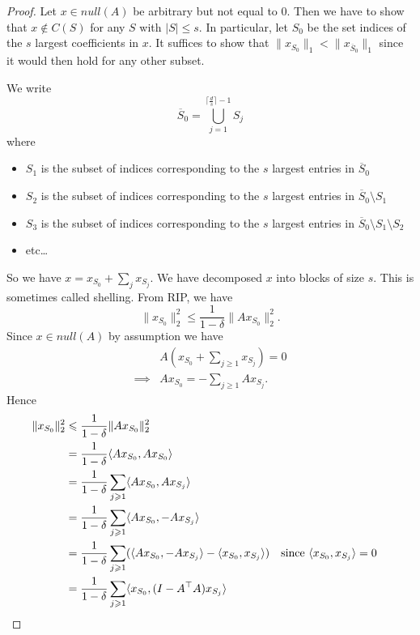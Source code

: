\documentclass[11pt]{article}
\begin{document}
\begin{proof}
Let $x \in null(A)$ be arbitrary but not equal to $0$. Then we have to show that $x \not\in C(S)$ for any $S$ with $|S| \le s$. In particular, let $S_0$ be the set indices of the $s$ largest coefficients in $x$. It suffices to show that $\|x_{S_0}\|_1 <  \|x_{\overline{S}_0}\|_1$ since it would then hold for any other subset.

We write
\[
\overline{S}_0 = \bigcup\limits_{j = 1}^{\lceil \frac{d}{s} \rceil - 1} S_j
\]
where 
\begin{itemize}
\item $S_1$ is the subset of indices corresponding to the $s$ largest entries in $\overline{S}_0$
\item $S_2$ is the subset of indices corresponding to the $s$ largest entries in $\overline{S}_0\setminus S_1$
\item $S_3$ is the subset of indices corresponding to the $s$ largest entries in $\overline{S}_0\setminus S_1 \setminus S_2$
\item etc\ldots
\end{itemize}
So we have $x = x_{S_0} + \sum\limits_j x_{S_j}$. We have decomposed $x$ into blocks of size $s$. This is sometimes called shelling. From RIP, we have
\[
\|x_{S_0}\|_2^2 \le \frac{1}{1 - \delta}\|Ax_{S_0}\|_2^2.
\]
Since $x \in null(A)$ by assumption we have
\begin{align*}
&A(x_{S_0} + \sum\limits_{j \ge 1} x_{S_j}) = 0\\
\implies&Ax_{S_0} = -\sum\limits_{j \ge 1} Ax_{S_j}.
\end{align*}
Hence
\begin{align*}
\|x_{S_0}\|_2^2 &\le \frac{1}{1 - \delta}\|Ax_{S_0}\|_2^2\\
                &= \frac{1}{1 - \delta}\langle Ax_{S_0}, Ax_{S_0}\rangle\\
                &= \frac{1}{1 - \delta}\sum\limits_{j \ge 1}\langle Ax_{S_0}, Ax_{S_j}\rangle\\
                &= \frac{1}{1 - \delta}\sum\limits_{j \ge 1}\langle Ax_{S_0}, -Ax_{S_j}\rangle\\
                &=  \frac{1}{1 - \delta}\sum\limits_{j \ge 1}(\langle Ax_{S_0}, -Ax_{S_j}\rangle - \langle x_{S_0}, x_{S_j} \rangle) && \text{since $\langle x_{S_0}, x_{S_j} \rangle = 0$}\\                
                &=  \frac{1}{1 - \delta}\sum\limits_{j \ge 1}\langle x_{S_0}, (I - A^{\trans}A)x_{S_j}\rangle\\                

\end{align*}
\end{proof}
\end{document}
